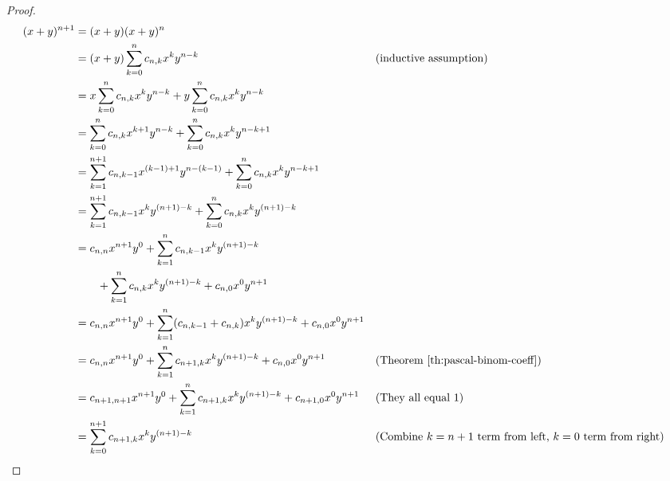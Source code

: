 \begin{proof}
\begin{align*}
(x+y)^{n+1} &= (x+y)(x+y)^n \\
&= (x+y) \sum_{k=0}^n c_{n,k} x^k y^{n-k} && \text{(inductive assumption)} \\
&= x \sum_{k=0}^n c_{n,k} x^k y^{n-k} + y \sum_{k=0}^n c_{n,k} x^k y^{n-k} \\
&= \sum_{k=0}^n c_{n,k} x^{k+1} y^{n-k} + \sum_{k=0}^n c_{n,k} x^k y^{n-k+1} \\
&= \sum_{k=1}^{n+1} c_{n,k-1} x^{(k-1)+1} y^{n-(k-1)} + \sum_{k=0}^n c_{n,k} x^k y^{n-k+1} \\
&= \sum_{k=1}^{n+1} c_{n,k-1} x^{k} y^{(n+1)-k} + \sum_{k=0}^n c_{n,k} x^k y^{(n+1)-k} \\
&= c_{n,n} x^{n+1} y^0 + \sum_{k=1}^{n} c_{n,k-1} x^{k} y^{(n+1)-k} \\
&\qquad+ \sum_{k=1}^n c_{n,k} x^k y^{(n+1)-k} + c_{n,0} x^0 y^{n+1} \\
&= c_{n,n} x^{n+1} y^0 + \sum_{k=1}^{n} (c_{n,k-1} + c_{n,k}) x^{k} y^{(n+1)-k} + c_{n,0} x^0 y^{n+1} \\
&= c_{n,n} x^{n+1} y^0 + \sum_{k=1}^{n} c_{n+1,k} x^{k} y^{(n+1)-k} + c_{n,0} x^0 y^{n+1} && \text{(Theorem \ref{th:pascal-binom-coeff})} \\
&= c_{n+1,n+1} x^{n+1} y^0 + \sum_{k=1}^{n} c_{n+1,k} x^{k} y^{(n+1)-k} + c_{n+1,0} x^0 y^{n+1} && \text{(They all equal 1)} \\
&= \sum_{k=0}^{n+1} c_{n+1,k} x^{k} y^{(n+1)-k} && \text{(Combine $k=n+1$ term from left, $k=0$ term from right)} \\
\end{align*}

\end{proof}





